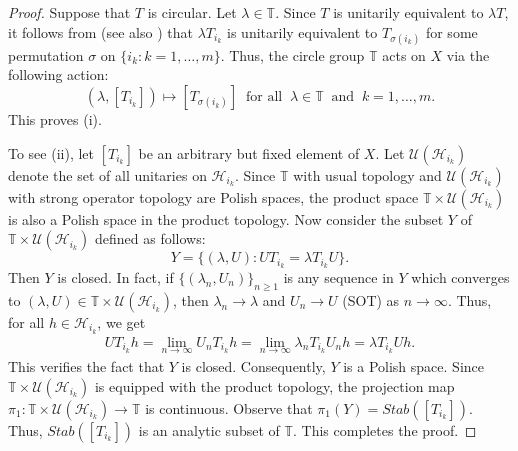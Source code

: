 \documentclass[10pt,a4paper]{amsart}
\newcommand{\beqn}{\begin{eqnarray*}}
\newcommand{\eeqn}{\end{eqnarray*}}
\begin{document}
\begin{proof}
Suppose that $T$ is circular. Let $\lambda \in \mathbb T$. Since $T$ is unitarily equivalent to $\lambda T$, it follows from \cite[Theorem 3.1]{FJW} (see also \cite[Proposition 3.4]{FJW}) that $\lambda T_{i_k}$ is unitarily equivalent to $T_{\sigma(i_k)}$ for some permutation $\sigma$ on $\{i_k : k = 1, \ldots, m\}$. Thus, the circle group $\mathbb T$ acts on $X$ via the following action:
\[(\lambda, [T_{i_k}]) \mapsto [T_{\sigma(i_k)}]\ \text{ for all }\ \lambda \in \mathbb T \ \text{ and }\ k = 1, \ldots, m.\]
This proves (i).

To see (ii), let $[T_{i_k}]$ be an arbitrary but fixed element of $X$. Let $\mathcal U(\mathcal H_{i_k})$ denote the set of all unitaries on $\mathcal H_{i_k}$. Since $\mathbb T$ with usual topology and $\mathcal U(\mathcal H_{i_k})$ with strong operator topology are Polish spaces, the product space $\mathbb T \times \mathcal U(\mathcal H_{i_k})$ is also a Polish space in the product topology. Now consider the subset $Y$ of $\mathbb T \times \mathcal U(\mathcal H_{i_k})$ defined as follows:
\[Y = \{(\lambda, U) : U T_{i_k} = \lambda T_{i_k} U\}.\]
Then $Y$ is closed. In fact, if $\{(\lambda_n, U_n)\}_{n \geqslant 1}$ is any sequence in $Y$ which converges to $(\lambda, U) \in \mathbb T \times \mathcal U(\mathcal H_{i_k})$, then $\lambda_n \to \lambda$ and $U_n \to U$ (SOT) as $n \to \infty$. Thus, for all $h \in \mathcal H_{i_k}$, we get
\beqn
U T_{i_k} h = \lim_{n \to \infty} U_n T_{i_k} h = \lim_{n \to \infty} \lambda_n T_{i_k} U_n h = \lambda T_{i_k} U h.
\eeqn
This verifies the fact that $Y$ is closed. Consequently, $Y$ is a Polish space. Since $\mathbb T \times \mathcal U(\mathcal H_{i_k})$ is equipped with the product topology, the projection map $\pi_1 : \mathbb T \times \mathcal U(\mathcal H_{i_k}) \to \mathbb T$ is continuous. Observe that $\pi_1(Y) = Stab([T_{i_k}])$. Thus, $Stab([T_{i_k}])$ is an analytic subset of $\mathbb T$. This completes the proof.
\end{proof}
\end{document}
